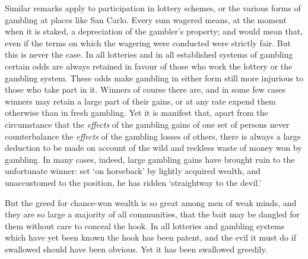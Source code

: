 \documentclass[letterpaper,12pt,oneside,openany]{memoir}
\begin{document}
Similar remarks apply to participation in lottery
schemes, or the various forms of gambling at places
like San Carlo. Every sum wagered means, at the
moment when it is staked, a depreciation of the gambler's
property; and would mean that, even if the terms
on which the wagering were conducted were strictly fair.
But this is never the case. In all lotteries and in all
established systems of gambling certain odds are always
retained in favour of those who work the lottery or
the gambling system. These odds make gambling in
either form still more injurious to those who take part
in it. Winners of course there are, and in some few
cases winners may retain a large part of their gains, or
at any rate expend them otherwise than in fresh gambling.
Yet it is manifest that, apart from the circumstance
that the \textit{effects} of the gambling gains of one set
of persons never counterbalance the \textit{effects} of the gambling
losses of others, there is always a large deduction
to be made on account of the wild and reckless waste
of money won by gambling. In many cases, indeed,
large gambling gains have brought ruin to the unfortunate
winner: set `on horseback' by lightly acquired
wealth, and unaccustomed to the position, he has ridden
`straightway to the devil.'

But the greed for chance-won wealth is so great
among men of weak minds, and they are so large a
majority of all communities, that the bait may be
dangled for them without care to conceal the hook. In
all lotteries and gambling systems which have yet been
known the hook has been patent, and the evil it must
do if swallowed should have been obvious. Yet it has
been swallowed greedily.
\end{document}
